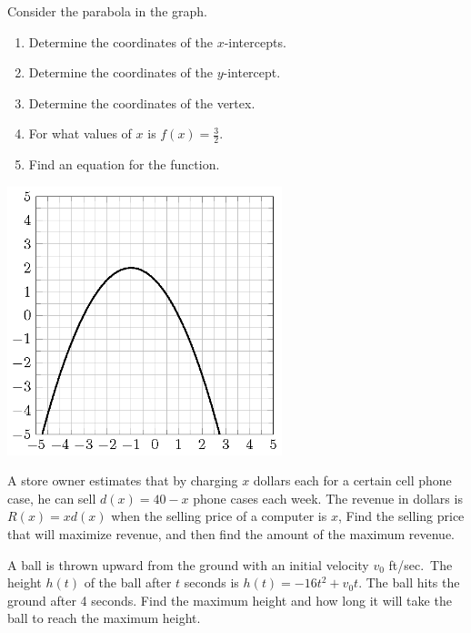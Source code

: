 \documentclass[en,12pt]{elegantbook}
\providecommand{\tightlist}{%
  \setlength{\itemsep}{0pt}\setlength{\parskip}{0pt}}
\providecommand{\tightlist}{%
  \setlength{\itemsep}{0pt}\setlength{\parskip}{0pt}}
\let\BeginKnitrBlock\begin \let\EndKnitrBlock\end
\begin{document}
\BeginKnitrBlock{exercise}
\protect\hypertarget{exr:unnamed-chunk-267}{}{\label{exr:unnamed-chunk-267} }
Consider the parabola in the graph.

\begin{enumerate}
\def\labelenumi{\arabic{enumi}.}
\tightlist
\item
  Determine the coordinates of the \(x\)-intercepts.
\item
  Determine the coordinates of the \(y\)-intercept.
\item
  Determine the coordinates of the vertex.
\item
  For what values of \(x\) is \(f(x)=\frac{3}{2}\).
\item
  Find an equation for the function.
\end{enumerate}

\includegraphics[width=0.6\textwidth,height=\textheight]{figs/tikz-exercise-graph-quadratic-2.png}\\
\EndKnitrBlock{exercise}

\BeginKnitrBlock{exercise}
\protect\hypertarget{exr:unnamed-chunk-268}{}{\label{exr:unnamed-chunk-268} }
A store owner estimates that by charging \(x\) dollars each for a certain cell phone case, he can sell \(d(x)=40 - x\) phone cases each week. The revenue in dollars is \(R(x)=xd(x)\) when the selling price of a computer is \(x\), Find the selling price that will maximize revenue, and then find the amount of the maximum revenue.
\EndKnitrBlock{exercise}

\BeginKnitrBlock{exercise}
\protect\hypertarget{exr:unnamed-chunk-269}{}{\label{exr:unnamed-chunk-269} }
A ball is thrown upward from the ground with an initial velocity \(v_0\) ft/sec.~The height \(h(t)\) of the ball after \(t\) seconds is \(h(t)= -16t^2 + v_0t\). The ball hits the ground after 4 seconds.
Find the maximum height and how long it will take the ball to reach the maximum height.
\EndKnitrBlock{exercise}
\end{document}
